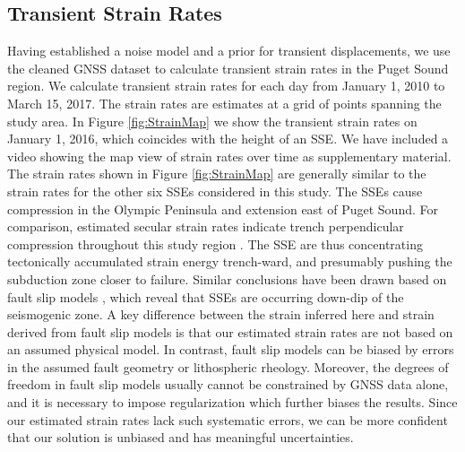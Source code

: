\documentclass[10pt,letter]{article}
\begin{document}
\subsection{Transient Strain Rates}\label{sec:Results} 
Having established a noise model and a prior for transient displacements, we use the cleaned GNSS dataset to calculate transient strain rates in the Puget Sound region.  We calculate transient strain rates for each day from January 1, 2010 to March 15, 2017. The strain rates are estimates at a grid of points spanning the study area. In Figure \ref{fig:StrainMap} we show the transient strain rates on January 1, 2016, which coincides with the height of an SSE. We have included a video showing the map view of strain rates over time as supplementary material. The strain rates shown in Figure \ref{fig:StrainMap} are generally similar to the strain rates for the other six SSEs considered in this study. The SSEs cause compression in the Olympic Peninsula and extension east of Puget Sound. For comparison, estimated secular strain rates indicate trench perpendicular compression throughout this study region \citep{Murray2000,McCaffrey2007,McCaffrey2013}. The SSE are thus concentrating tectonically accumulated strain energy trench-ward, and presumably pushing the subduction zone closer to failure. Similar conclusions have been drawn based on fault slip models \citep[e.g.,][]{Dragert2001,Wech2009,Schmidt2010}, which reveal that SSEs are occurring down-dip of the seismogenic zone. A key difference between the strain inferred here and strain derived from fault slip models is that our estimated strain rates are not based on an assumed physical model. In contrast, fault slip models can be biased by errors in the assumed fault geometry or lithospheric rheology. Moreover, the degrees of freedom in fault slip models usually cannot be constrained by GNSS data alone, and it is necessary to impose regularization which further biases the results. Since our estimated strain rates lack such systematic errors, we can be more confident that our solution is unbiased and has meaningful uncertainties.  
\end{document}
